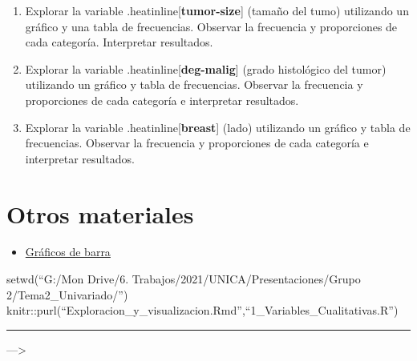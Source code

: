 \documentclass[
]{article}
\providecommand{\tightlist}{%
  \setlength{\itemsep}{0pt}\setlength{\parskip}{0pt}}
\begin{document}
\begin{enumerate}
\def\labelenumi{\arabic{enumi}.}
\item
  Explorar la variable .heatinline{[}\textbf{tumor-size}{]} (tamaño del
  tumo) utilizando un gráfico y una tabla de frecuencias. Observar la
  frecuencia y proporciones de cada categoría. Interpretar resultados.
\item
  Explorar la variable .heatinline{[}\textbf{deg-malig}{]} (grado
  histológico del tumor) utilizando un gráfico y tabla de frecuencias.
  Observar la frecuencia y proporciones de cada categoría e interpretar
  resultados.
\item
  Explorar la variable .heatinline{[}\textbf{breast}{]} (lado)
  utilizando un gráfico y tabla de frecuencias. Observar la frecuencia y
  proporciones de cada categoría e interpretar resultados.
\end{enumerate}

\hypertarget{otros-materiales}{%
\section{Otros materiales}\label{otros-materiales}}

\begin{itemize}
\tightlist
\item
  \href{https://bookdown.org/jboscomendoza/r-principiantes4/graficas-de-barras.html}{Gráficos
  de barra}
\end{itemize}

setwd(``G:/Mon Drive/6. Trabajos/2021/UNICA/Presentaciones/Grupo
2/Tema2\_Univariado/'')
knitr::purl(``Exploracion\_y\_visualizacion.Rmd'',``1\_Variables\_Cualitativas.R'')

\begin{center}\rule{0.5\linewidth}{0.5pt}\end{center}

---\textgreater{}
\end{document}
